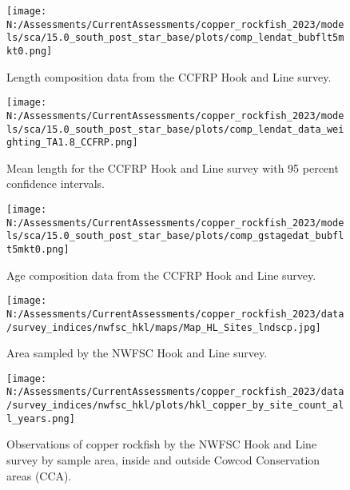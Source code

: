 \documentclass[11pt,
  english,
  letterpaper,
]{article}
\begin{document}
\pagebreak

\begin{figure}
\centering
\texttt{[image: N:/Assessments/CurrentAssessments/copper\_rockfish\_2023/models/sca/15.0\_south\_post\_star\_base/plots/comp\_lendat\_bubflt5mkt0.png]}
\caption{Length composition data from the CCFRP Hook and Line survey.\label{fig:ccfrp-len-data}}
\end{figure}

\pagebreak

\begin{figure}
\centering
\texttt{[image: N:/Assessments/CurrentAssessments/copper\_rockfish\_2023/models/sca/15.0\_south\_post\_star\_base/plots/comp\_lendat\_data\_weighting\_TA1.8\_CCFRP.png]}
\caption{Mean length for the CCFRP Hook and Line survey with 95 percent confidence intervals.\label{fig:ccfrp-mean-len-data}}
\end{figure}

\pagebreak

\begin{figure}
\centering
\texttt{[image: N:/Assessments/CurrentAssessments/copper\_rockfish\_2023/models/sca/15.0\_south\_post\_star\_base/plots/comp\_gstagedat\_bubflt5mkt0.png]}
\caption{Age composition data from the CCFRP Hook and Line survey.\label{fig:ccfrp-age-data}}
\end{figure}

\pagebreak

\begin{figure}
\centering
\texttt{[image: N:/Assessments/CurrentAssessments/copper\_rockfish\_2023/data/survey\_indices/nwfsc\_hkl/maps/Map\_HL\_Sites\_lndscp.jpg]}
\caption{Area sampled by the NWFSC Hook and Line survey.\label{fig:nwfsc-hkl-map}}
\end{figure}

\pagebreak

\begin{figure}
\centering
\texttt{[image: N:/Assessments/CurrentAssessments/copper\_rockfish\_2023/data/survey\_indices/nwfsc\_hkl/plots/hkl\_copper\_by\_site\_count\_all\_years.png]}
\caption{Observations of copper rockfish by the NWFSC Hook and Line survey by sample area, inside and outside Cowcod Conservation areas (CCA).\label{fig:nwfsc-hkl-site}}
\end{figure}

\pagebreak
\end{document}
